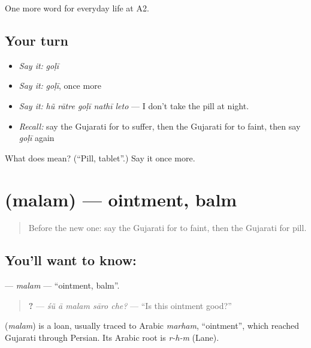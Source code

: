 \begin{grammarlens}[title={What you've built}]
One more word for everyday life at A2.
\end{grammarlens}

\subsection*{Your turn}
\begin{itemize}
\raggedright
  \item \emph{Say it:} \emph{goḷī}
  \item \emph{Say it:} \emph{goḷī}, once more
  \item \emph{Say it:} \emph{hũ rātre goḷī nathī leto} — I don't take the pill at night.
  \item \emph{Recall:} say the Gujarati for to suffer, then the Gujarati for to faint, then say \emph{goḷī} again
\end{itemize}

\begin{tcolorbox}[breakable,colback=teal!4,colframe=teal!35!black,title={Before you move on}]
What does  mean? (\textquotedblleft{}Pill, tablet\textquotedblright{}.) Say it once more.
\end{tcolorbox}
\section[\texorpdfstring{\gu{મલમ} (malam)}{મલમ (malam)}]{ (malam) — ointment, balm}

\label{lesson:GU-C231-malam}



\begin{quote}
Before the new one: say the Gujarati for to faint, then the Gujarati for pill.
\end{quote}

\subsection*{You'll want to know: }
\textbf{} — \emph{malam} — \textquotedblleft{}ointment, balm\textquotedblright{}.

\begin{quote}
\textbf{    ?} — \emph{śũ ā malam sāro che?} — \textquotedblleft{}Is this ointment good?\textquotedblright{}
\end{quote}

\begin{cousinweb}
\textbf{} (\emph{malam}) is a loan, usually traced to Arabic \emph{marham}, \textquotedblleft{}ointment\textquotedblright{}, which reached Gujarati through Persian. Its Arabic root is \emph{r-h-m} (Lane).
\end{cousinweb}

